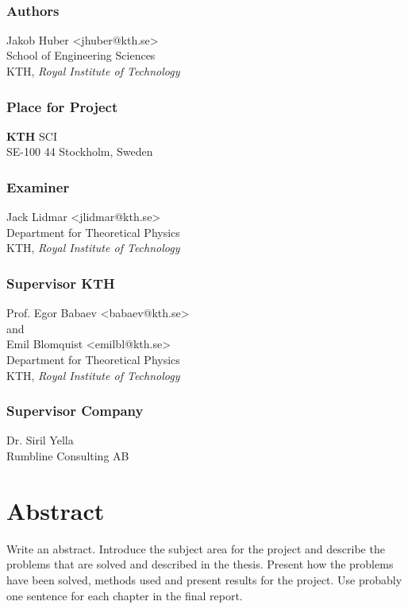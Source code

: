 \newpage
\thispagestyle{plain}
~\\
\vfill
{ 
	\subsection*{Authors}
	Jakob Huber <jhuber@kth.se>\\
	School of Engineering Sciences\\
	KTH, \textit{Royal Institute of Technology}
	
	\subsection*{Place for Project}
	\textbf{KTH} SCI\\
	SE-100 44 Stockholm, Sweden

	\subsection*{Examiner}
	Jack Lidmar <jlidmar@kth.se>\\
	Department for Theoretical Physics \\
	KTH, \textit{Royal Institute of Technology}
	
	\subsection*{Supervisor KTH}
	Prof. Egor Babaev <babaev@kth.se>\\
	and \\
	Emil Blomquist <emilbl@kth.se>\\
	Department for Theoretical Physics\\
	KTH, \textit{Royal Institute of Technology}


	\subsection*{Supervisor Company}
	Dr. Siril Yella \\
	Rumbline Consulting AB
}


\newpage
\thispagestyle{plain}
\chapter*{Abstract}

Write an abstract. Introduce the subject area for the project and describe the problems that are solved and described in the thesis. Present how the problems have been solved, methods used and present results for the project. Use probably one sentence for each chapter in the final report.

